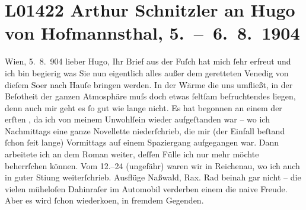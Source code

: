 

\section[Arthur Schnitzler an Hugo von Hofmannsthal, 5. – 6. 8. 1904]{L01422 Arthur Schnitzler an Hugo von Hofmannsthal, 5. – 6. 8. 1904}
\nopagebreak{}
\rehead{ }\normalsize\beginnumbering{}
\toendnotes[C]{\smallbreak\pagebreak[2]}
\toendnotes[C]{\smallbreak}
\pstart
           \raggedleft{}{\pb}Wien, 5. 8. 904\pend
           \vspace{0.5em}
\pstart
           lieber Hugo, Ihr Brief aus der Fuſch hat mich ſehr erfreut und ich bin begierig was Sie nun eigentlich
               alles außer dem geretteten Venedig von dieſem
                  So{\geminationm}er nach Hauſe bringen werden. In der Wärme die uns
               umfließt, in der Beſo{\geminationn}theit der ganzen Atmosphäre muſs
               doch etwas ſeltſam befruchtendes liegen, denn auch mir geht es ſo gut wie lange
               nicht. Es hat begonnen an einem der erſten \label{K_L01422-1v}\label{K_L01422-1}, da ich von meinem Unwohlſein wieder aufgeſtanden war – wo ich \introOben{}Nachmittags\introOben{} eine ganze Novellette
               niederſchrieb, die mir (der Einfall beſtand ſchon ſeit {\pb}lange) Vormittags auf einem Spaziergang aufgegangen war. Dann
               arbeitete ich an dem Roman
               weiter, deſſen Fülle ich nur mehr möchte beherrſchen können. Vom
                  12.–24 (ungefähr) waren wir in Reichenau, wo ich auch in guter Sti{\geminationm}ung weiterſchrieb. Ausflüge Naßwald, Rax. Rad beinah gar nicht – die vielen müheloſen
               Dahinraſer im Automobil verderben einem die naive Freude. Aber es wird ſchon
                  wiederko{\geminationm}en, in fremdem Gegenden.\pend
           
